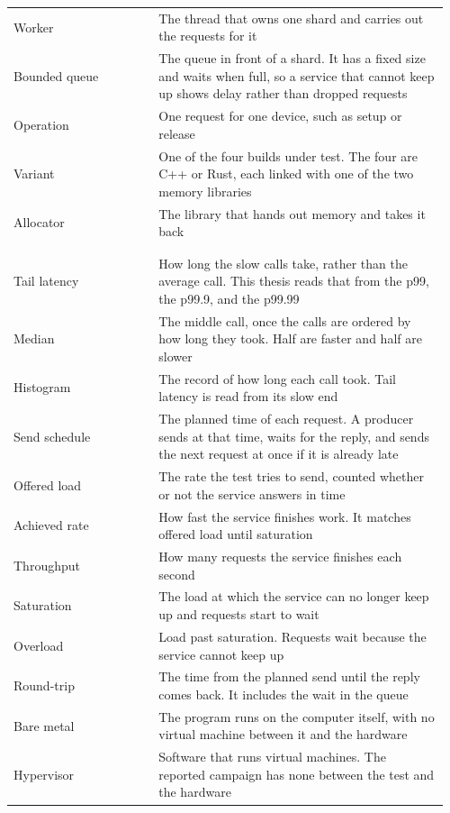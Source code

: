 \documentclass[english,oneside,a4paper,censored,csm,software-track-2020]{HYthesisML}
\begin{document}
\begin{longtable}{@{}>{\scriptsize\raggedright\arraybackslash}p{0.32\linewidth} >{\scriptsize\raggedright\arraybackslash}p{0.64\linewidth}@{}}
Worker & The thread that owns one shard and carries out the requests for it \\
Bounded queue & The queue in front of a shard. It has a fixed size and waits when full, so a service that cannot keep up shows delay rather than dropped requests \\
Operation & One request for one device, such as setup or release \\
Variant & One of the four builds under test. The four are C++ or Rust, each linked with one of the two memory libraries \\
Allocator & The library that hands out memory and takes it back \\
\\[2pt]
\multicolumn{2}{@{}l}{\scriptsize\emph{Timing}}\\*[1pt]
Tail latency & How long the slow calls take, rather than the average call. This thesis reads that from the p99, the p99.9, and the p99.99 \\
Median & The middle call, once the calls are ordered by how long they took. Half are faster and half are slower \\
Histogram & The record of how long each call took. Tail latency is read from its slow end \\
Send schedule & The planned time of each request. A producer sends at that time, waits for the reply, and sends the next request at once if it is already late \\
Offered load & The rate the test tries to send, counted whether or not the service answers in time \\
Achieved rate & How fast the service finishes work. It matches offered load until saturation \\
Throughput & How many requests the service finishes each second \\
Saturation & The load at which the service can no longer keep up and requests start to wait \\
Overload & Load past saturation. Requests wait because the service cannot keep up \\
Round-trip & The time from the planned send until the reply comes back. It includes the wait in the queue \\
Bare metal & The program runs on the computer itself, with no virtual machine between it and the hardware \\
Hypervisor & Software that runs virtual machines. The reported campaign has none between the test and the hardware \\

\end{longtable}
\end{document}
